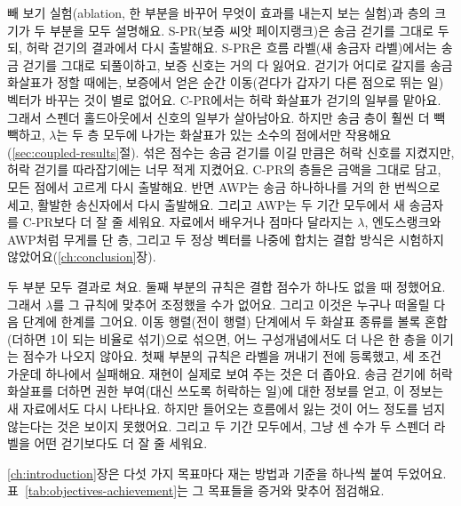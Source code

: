 빼 보기 실험(ablation, 한 부분을 바꾸어 무엇이 효과를 내는지 보는 실험)과 층의 크기가 두 부분을 모두 설명해요. S-PR(보증 씨앗 페이지랭크)은 송금 걷기를 그대로 두되, 허락 걷기의 결과에서 다시 출발해요. S-PR은 흐름 라벨(새 송금자 라벨)에서는 송금 걷기를 그대로 되풀이하고, 보증 신호는 거의 다 잃어요. 걷기가 어디로 갈지를 송금 화살표가 정할 때에는, 보증에서 얻은 순간 이동(걷다가 갑자기 다른 점으로 뛰는 일) 벡터가 바꾸는 것이 별로 없어요. C-PR에서는 허락 화살표가 걷기의 일부를 맡아요. 그래서 스펜더 홀드아웃에서 신호의 일부가 살아남아요. 하지만 송금 층이 훨씬 더 빽빽하고, $\lambda$는 두 층 모두에 나가는 화살표가 있는 소수의 점에서만 작용해요(\ref{sec:coupled-results}절). 섞은 점수는 송금 걷기를 이길 만큼은 허락 신호를 지켰지만, 허락 걷기를 따라잡기에는 너무 적게 지켰어요. C-PR의 층들은 금액을 그대로 담고, 모든 점에서 고르게 다시 출발해요. 반면 AWP는 송금 하나하나를 거의 한 번씩으로 세고, 활발한 송신자에서 다시 출발해요. 그리고 AWP는 두 기간 모두에서 새 송금자를 C-PR보다 더 잘 줄 세워요. 자료에서 배우거나 점마다 달라지는 $\lambda$, 엔도스랭크와 AWP처럼 무게를 단 층, 그리고 두 정상 벡터를 나중에 합치는 결합 방식은 시험하지 않았어요(\ref{ch:conclusion}장).

두 부분 모두 결과로 쳐요. 둘째 부분의 규칙은 결합 점수가 하나도 없을 때 정했어요. 그래서 $\lambda$를 그 규칙에 맞추어 조정했을 수가 없어요. 그리고 이것은 누구나 떠올릴 다음 단계에 한계를 그어요. 이동 행렬(전이 행렬) 단계에서 두 화살표 종류를 볼록 혼합(더하면 1이 되는 비율로 섞기)으로 섞으면, 어느 구성개념에서도 더 나은 한 층을 이기는 점수가 나오지 않아요. 첫째 부분의 규칙은 라벨을 꺼내기 전에 등록했고, 세 조건 가운데 하나에서 실패해요. 재현이 실제로 보여 주는 것은 더 좁아요. 송금 걷기에 허락 화살표를 더하면 권한 부여(대신 쓰도록 허락하는 일)에 대한 정보를 얻고, 이 정보는 새 자료에서도 다시 나타나요. 하지만 들어오는 흐름에서 잃는 것이 어느 정도를 넘지 않는다는 것은 보이지 못했어요. 그리고 두 기간 모두에서, 그냥 센 수가 두 스펜더 라벨을 어떤 걷기보다도 더 잘 줄 세워요.


\ref{ch:introduction}장은 다섯 가지 목표마다 재는 방법과 기준을 하나씩 붙여 두었어요. 표~\ref{tab:objectives-achievement}는 그 목표들을 증거와 맞추어 점검해요.


